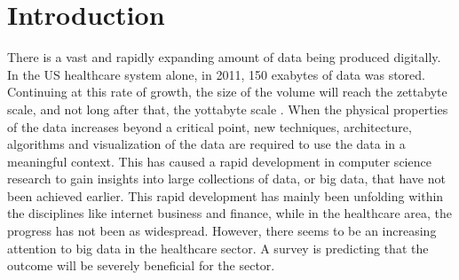 \section{Introduction}
There is a vast and rapidly expanding amount of data being produced digitally. In the US healthcare system alone, in 2011, 150 exabytes of data was stored. Continuing at this rate of growth, the size of the volume will reach the zettabyte scale, and not long after that, the yottabyte scale \cite{intro}. 
When the physical properties of the data increases beyond a critical point, new techniques, architecture, algorithms and visualization of the data are required to use the data in a meaningful context. This has caused a rapid development in computer science research to gain insights into large collections of data, or big data, that have not been achieved earlier. This rapid development has mainly been unfolding within the disciplines like internet business and finance, while in the healthcare area, the progress has not been as widespread. However, there seems to be an increasing attention to big data in the healthcare sector. A survey is predicting that the outcome will be severely beneficial for the sector.\cite{gg}


